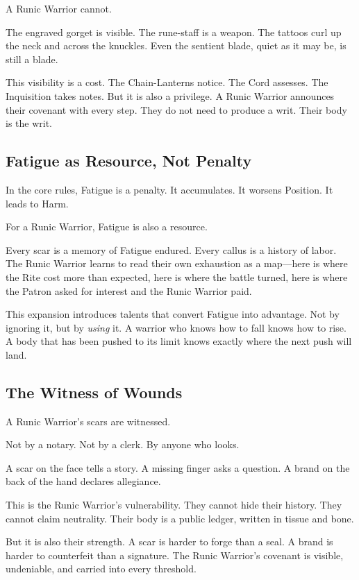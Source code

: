 A Runic Warrior cannot.

The engraved gorget is visible. The rune-staff is a weapon. The tattoos curl up the neck and across the knuckles. Even the sentient blade, quiet as it may be, is still a blade.

This visibility is a cost. The Chain-Lanterns notice. The Cord assesses. The Inquisition takes notes. But it is also a privilege. A Runic Warrior announces their covenant with every step. They do not need to produce a writ. Their body is the writ.

\subsection{Fatigue as Resource, Not Penalty}

In the core rules, Fatigue is a penalty. It accumulates. It worsens Position. It leads to Harm.

For a Runic Warrior, Fatigue is also a resource.

Every scar is a memory of Fatigue endured. Every callus is a history of labor. The Runic Warrior learns to read their own exhaustion as a map—here is where the Rite cost more than expected, here is where the battle turned, here is where the Patron asked for interest and the Runic Warrior paid.

This expansion introduces talents that convert Fatigue into advantage. Not by ignoring it, but by \textit{using} it. A warrior who knows how to fall knows how to rise. A body that has been pushed to its limit knows exactly where the next push will land.

\subsection{The Witness of Wounds}

A Runic Warrior's scars are witnessed.

Not by a notary. Not by a clerk. By anyone who looks.

A scar on the face tells a story. A missing finger asks a question. A brand on the back of the hand declares allegiance.

This is the Runic Warrior's vulnerability. They cannot hide their history. They cannot claim neutrality. Their body is a public ledger, written in tissue and bone.

But it is also their strength. A scar is harder to forge than a seal. A brand is harder to counterfeit than a signature. The Runic Warrior's covenant is visible, undeniable, and carried into every threshold.

